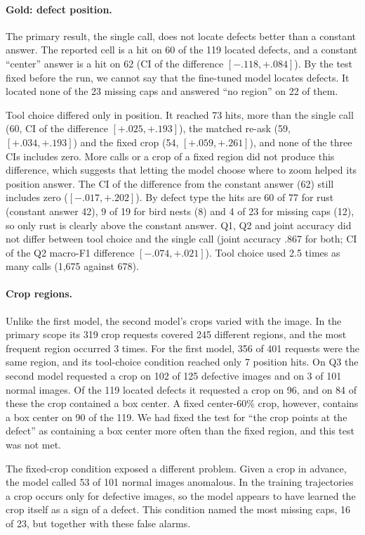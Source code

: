 \documentclass[11pt]{article}
\begin{document}
\paragraph{Gold: defect position.} The primary result, the single call, does not locate defects better than a constant answer. The reported cell is a hit on 60 of the 119 located defects, and a constant ``center'' answer is a hit on 62 (CI of the difference $[-.118,+.084]$). By the test fixed before the run, we cannot say that the fine-tuned model locates defects. It located none of the 23 missing caps and answered ``no region'' on 22 of them.

Tool choice differed only in position. It reached 73 hits, more than the single call (60, CI of the difference $[+.025,+.193]$), the matched re-ask (59, $[+.034,+.193]$) and the fixed crop (54, $[+.059,+.261]$), and none of the three CIs includes zero. More calls or a crop of a fixed region did not produce this difference, which suggests that letting the model choose where to zoom helped its position answer. The CI of the difference from the constant answer (62) still includes zero ($[-.017,+.202]$). By defect type the hits are 60 of 77 for rust (constant answer 42), 9 of 19 for bird nests (8) and 4 of 23 for missing caps (12), so only rust is clearly above the constant answer. Q1, Q2 and joint accuracy did not differ between tool choice and the single call (joint accuracy .867 for both; CI of the Q2 macro-F1 difference $[-.074,+.021]$). Tool choice used 2.5 times as many calls (1,675 against 678).

\paragraph{Crop regions.} Unlike the first model, the second model's crops varied with the image. In the primary scope its 319 crop requests covered 245 different regions, and the most frequent region occurred 3 times. For the first model, 356 of 401 requests were the same region, and its tool-choice condition reached only 7 position hits. On Q3 the second model requested a crop on 102 of 125 defective images and on 3 of 101 normal images. Of the 119 located defects it requested a crop on 96, and on 84 of these the crop contained a box center. A fixed center-60\% crop, however, contains a box center on 90 of the 119. We had fixed the test for ``the crop points at the defect'' as containing a box center more often than the fixed region, and this test was not met.

The fixed-crop condition exposed a different problem. Given a crop in advance, the model called 53 of 101 normal images anomalous. In the training trajectories a crop occurs only for defective images, so the model appears to have learned the crop itself as a sign of a defect. This condition named the most missing caps, 16 of 23, but together with these false alarms.
\end{document}
